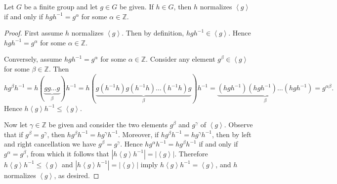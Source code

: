 \documentclass[10pt]{amsart}
\newcommand{\abs}[1]{\left| #1 \right|}
\begin{document}
\begin{lem}\label{normal}
  Let $G$ be a finite group and let $g \in G$ be given.  
  If $h \in G$, then $h$ normalizes $\left<g\right>$ if and only if $hgh^{-1} = g^\alpha$ for some $\alpha \in \mathbb{Z}$.
  
  \begin{proof}
    First assume $h$ normalizes $\left<g\right>$.
    Then by definition, $hgh^{-1} \in \left<g\right>$.
    Hence $hgh^{-1} = g^\alpha$ for some $\alpha \in \mathbb{Z}$.
    
    Conversely, assume $hgh^{-1} = g^\alpha$ for some $\alpha \in \mathbb{Z}$.
    Consider any element $g^\beta \in \left< g \right>$ for some $\beta \in \mathbb{Z}$.
    Then $$hg^\beta h^{-1} = h(\underbrace{gg \ldots g}_{\beta}) h^{-1} = h(\underbrace{g(h^{-1}h)g(h^{-1}h) \ldots (h^{-1}h)g}_{\beta}) h^{-1} = \underbrace{(hgh^{-1})(hgh^{-1})\ldots (hgh^{-1})}_{\beta} = g^{\alpha\beta}.$$
    Hence $h\left<g\right>h^{-1} \leq \left<g\right>$.
    
	Now let $\gamma \in \mathbb{Z}$ be given and consider the two elements $g^\beta$ and $g^\gamma$ of $\left<g\right>$.
    Observe that if $g^\beta = g^\gamma$, then $hg^\beta h^{-1} = hg^\gamma h^{-1}$.
    Moreover, if $hg^\beta h^{-1} = hg^\gamma h^{-1}$, then by left and right cancellation we have $g^\beta = g^\gamma$.
    Hence $hg^\alpha h^{-1} = hg^\beta h^{-1}$ if and only if $g^\alpha = g^\beta$, from which it follows that $\abs{h\left<g\right>h^{-1}} = \abs{\left<g\right>}$.
	Therefore $h\left<g\right>h^{-1} \leq \left<g\right>$ and $\abs{h\left<g\right>h^{-1}} = \abs{\left<g\right>}$ imply $h\left<g\right>h^{-1} = \left<g\right>$, and $h$ normalizes $\left<g\right>$, as desired.
  \end{proof}
\end{lem}
\end{document}
